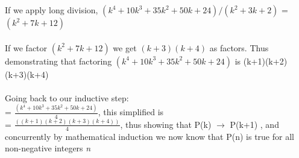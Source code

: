 \documentclass{article}
\begin{document}
If we apply long division, $(k^4 + 10k^3 + 35k^2 + 50k + 24) / (k^2 + 3k + 2)$ = $(k^2 + 7k + 12 )$\\ \\
If we factor $(k^2 + 7k + 12 )$ we get $(k+3)(k+4)$ as factors. Thus demonstrating that factoring $(k^4 + 10k^3 + 35k^2 + 50k+ 24) $ is (k+1)(k+2)(k+3)(k+4)\\\\
Going back to our inductive step: \\= {$ \frac{(k^4 + 10k^3 + 35k^2 + 50k + 24)}{4}$}, this simplified is \\ 
= {$ \frac{((k+1)(k+2)(k+3)(k+4))}{4}$}, thus showing that P(k) $\rightarrow$ P(k+1) , and concurrently by mathematical induction we now know that P(n) is true for all non-negative integers \emph{n} \\\\
\end{document}
